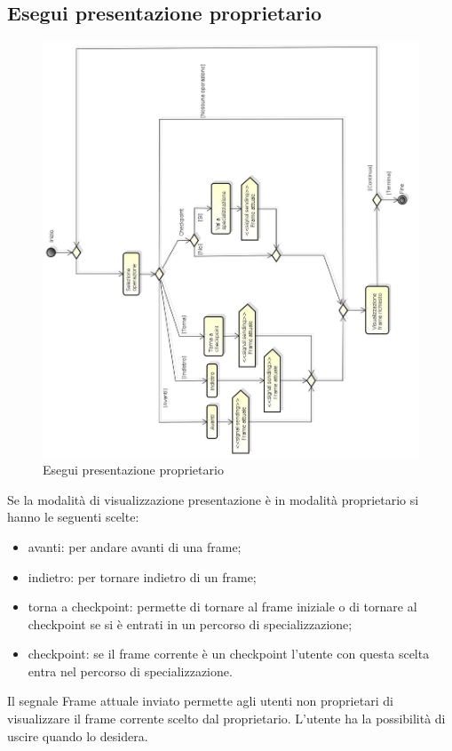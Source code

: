 \newpage

\subsection{Esegui presentazione proprietario}

\begin{figure}[h!]
		\centering
		\includegraphics[scale=.4]{img/Esegui_presentazione_proprietario.jpg}
		\caption{Esegui presentazione proprietario}
		\label{fig:Esegui_presentazione_proprietario}
\end{figure}

Se la modalità di visualizzazione presentazione è in modalità proprietario si hanno le seguenti scelte: 
\begin{itemize}
\item
avanti: per andare avanti di una frame; 
\item 
indietro: per tornare indietro di un frame;
\item torna a checkpoint: permette di tornare al frame iniziale o di tornare al checkpoint se si è entrati in un percorso di specializzazione; 
\item checkpoint: se il frame corrente è un checkpoint l'utente con questa scelta entra nel percorso di specializzazione.
\end{itemize}
Il segnale Frame attuale inviato permette agli utenti non proprietari di visualizzare il frame corrente scelto dal proprietario.
L'utente ha la possibilità di uscire quando lo desidera.

